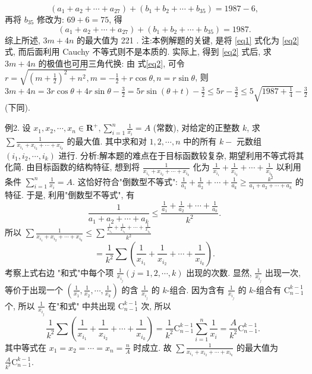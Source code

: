 $$
\left(a_1+a_2+\cdots+a_{27}\right)+\left(b_1+b_2+\cdots+b_{35}\right)=1987-6,
$$
再将 $b_{35}$ 修改为: $69+6=75$, 得
$$
\left(a_1+a_2+\cdots+a_{27}\right)+\left(b_1+b_2+\cdots+b_{35}\right)=1987 .
$$
综上所述, $3 m+4 n$ 的最大值为 221 .
注:本例解题的关键, 是将 \ref{eq1} 式化为 \ref{eq2} 式, 而后面利用 Cauchy 不等式则不是本质的.
实际上, 得到 \ref{eq2} 式后, 求 $3 m+4 n$ 的极值也可用三角代换:
由 式\ref{eq2}, 可令 $r=\sqrt{\left(m+\frac{1}{2}\right)^2+n^2}, m=-\frac{1}{2}+r \cos \theta, n=r \sin \theta$,
则 $3 m+4 n=3 r \cos \theta+4 r \sin \theta-\frac{3}{2}=5 r \sin (\theta+t)-\frac{3}{2} \leqslant 5 r-\frac{3}{2} \leqslant 5 \sqrt{1987+\frac{1}{4}}-\frac{3}{2}$ (下同).



例2. 设 $x_1, x_2, \cdots, x_n \in \mathbf{R}^{+}, \sum_{i=1}^n \frac{1}{x_i}=A$ (常数), 对给定的正整数 $k$, 求 $\sum \frac{1}{x_{i_1}+x_{i_2}+\cdots+x_{i_k}}$ 的最大值.
其中求和对 $1,2, \cdots, n$ 中的所有 $k-$ 元数组 $\left(i_1, i_2, \cdots, i_k\right)$ 进行.
分析:解本题的难点在于目标函数较复杂, 期望利用不等式将其化简.
由目标函数的结构特征, 想到将 $\frac{1}{x_{i_1}+x_{i_2}+\cdots+x_{i_k}}$ 化为 $\frac{1}{x_{i_1}}+\frac{1}{x_{i_2}}+\cdots+ \frac{1}{x_{i_k}}$ 以利用条件 $\sum_{i=1}^n \frac{1}{x_i}=A$. 这恰好符合"倒数型不等式": $\frac{1}{a_1}+\frac{1}{a_2}+\cdots+\frac{1}{a_k} \geqslant\frac{k^2}{a_1+a_2+\cdots+a_k}$ 的特征.
于是, 利用"倒数型不等式", 有
$$
\frac{1}{a_1+a_2+\cdots+a_k} \leqslant \frac{\frac{1}{a_1}+\frac{1}{a_2}+\cdots+\frac{1}{a_k}}{k^2} .
$$
所以 $\sum \frac{1}{x_{i_1}+x_{i_2}+\cdots+x_{i_k}} \leqslant \sum \frac{\frac{1}{x_{i_1}}+\frac{1}{x_{i_2}}+\cdots+\frac{1}{x_{i_k}}}{k^2}$
$$
=\frac{1}{k^2} \sum\left(\frac{1}{x_{i_1}}+\frac{1}{x_{i_2}}+\cdots+\frac{1}{x_{i_k}}\right) .
$$
考察上式右边 "和式"中每个项 $\frac{1}{x_{i_j}}(j=1,2, \cdots, k)$ 出现的次数.
显然, $\frac{1}{x_{i_j}}$ 出现一次, 等价于出现一个 $\left(\frac{1}{x_1}, \frac{1}{x_2}, \cdots, \frac{1}{x_k}\right)$ 的含 $\frac{1}{x_{i_j}}$ 的 $k$-组合.
因为含有 $\frac{1}{x_{i_j}}$ 的 $k$-组合有 $\mathrm{C}_{n-1}^{k-1}$ 个, 所以 $\frac{1}{x_{i_j}}$ 在"和式" 中共出现 $\mathrm{C}_{n-1}^{k-1}$ 次, 所以
$$
\frac{1}{k^2} \sum\left(\frac{1}{x_{i_1}}+\frac{1}{x_{i_2}}+\cdots+\frac{1}{x_{i_k}}\right)=\frac{1}{k^2} \mathrm{C}_{n-1}^{k-1} \sum_{i=1}^n \frac{1}{x_i}=\frac{A}{k^2} \mathrm{C}_{n-1}^{k-1} \text {. }
$$
其中等式在 $x_1=x_2=\cdots=x_n=\frac{n}{A}$ 时成立.
故 $\sum \frac{1}{x_{i_1}+x_{i_2}+\cdots+x_{i_k}}$ 的最大值为 $\frac{A}{k^2} \mathrm{C}_{n-1}^{k-1}$.



